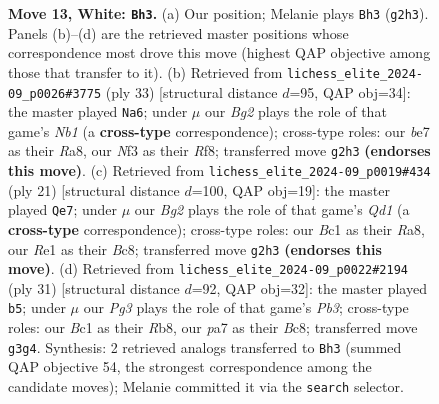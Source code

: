 \documentclass[11pt]{article}
\begin{document}
\begin{figure}[p]
\caption{\textbf{Move 13, White: \texttt{Bh3}.} (a) Our position; Melanie plays \texttt{Bh3} (\texttt{g2h3}). Panels (b)--(d) are the retrieved master positions whose correspondence most drove this move (highest QAP objective among those that transfer to it). (b) Retrieved from \texttt{lichess\_elite\_2024-09\_p0026\#3775} (ply 33) [structural distance $d$=95, QAP obj=34]: the master played \texttt{Na6}; under $\mu$ our \emph{Bg2} plays the role of that game's \emph{Nb1} (a \textbf{cross-type} correspondence); cross-type roles: our \emph{b}e7 as their \emph{R}a8, our \emph{N}f3 as their \emph{R}f8; transferred move \texttt{g2h3} \textbf{(endorses this move)}. (c) Retrieved from \texttt{lichess\_elite\_2024-09\_p0019\#434} (ply 21) [structural distance $d$=100, QAP obj=19]: the master played \texttt{Qe7}; under $\mu$ our \emph{Bg2} plays the role of that game's \emph{Qd1} (a \textbf{cross-type} correspondence); cross-type roles: our \emph{B}c1 as their \emph{R}a8, our \emph{R}e1 as their \emph{B}c8; transferred move \texttt{g2h3} \textbf{(endorses this move)}. (d) Retrieved from \texttt{lichess\_elite\_2024-09\_p0022\#2194} (ply 31) [structural distance $d$=92, QAP obj=32]: the master played \texttt{b5}; under $\mu$ our \emph{Pg3} plays the role of that game's \emph{Pb3}; cross-type roles: our \emph{B}c1 as their \emph{R}b8, our \emph{p}a7 as their \emph{B}c8; transferred move \texttt{g3g4}. Synthesis: 2 retrieved analogs transferred to \texttt{Bh3} (summed QAP objective 54, the strongest correspondence among the candidate moves); Melanie committed it via the \texttt{search} selector.}
\label{fig:thought-m24}
\end{figure}

\clearpage
\end{document}
